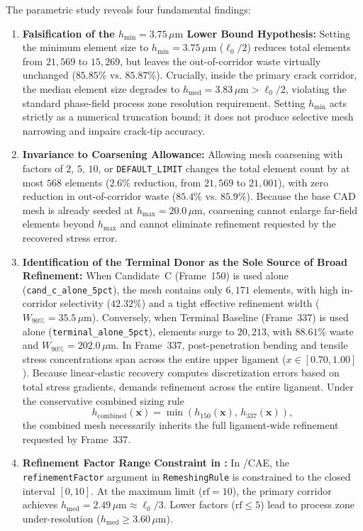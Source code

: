 The parametric study reveals four fundamental findings:
\begin{enumerate}
  \item \textbf{Falsification of the $h_{\min} = 3.75\,\mu\mathrm{m}$ Lower Bound Hypothesis:} Setting the minimum element size to $h_{\min} = 3.75\,\mu\mathrm{m}$ ($\ell_0/2$) reduces total elements from $21{,}569$ to $15{,}269$, but leaves the out-of-corridor waste virtually unchanged ($85.85\%$ vs. $85.87\%$). Crucially, inside the primary crack corridor, the median element size degrades to $h_{\mathrm{med}} = 3.83\,\mu\mathrm{m} > \ell_0/2$, violating the standard phase-field process zone resolution requirement. Setting $h_{\min}$ acts strictly as a numerical truncation bound; it does not produce selective mesh narrowing and impairs crack-tip accuracy.
  \item \textbf{Invariance to Coarsening Allowance:} Allowing mesh coarsening with factors of $2$, $5$, $10$, or \texttt{DEFAULT\_LIMIT} changes the total element count by at most $568$ elements ($2.6\%$ reduction, from $21{,}569$ to $21{,}001$), with zero reduction in out-of-corridor waste ($85.4\%$ vs. $85.9\%$). Because the base CAD mesh is already seeded at $h_{\max} = 20.0\,\mu\mathrm{m}$, coarsening cannot enlarge far-field elements beyond $h_{\max}$ and cannot eliminate refinement requested by the recovered stress error.
  \item \textbf{Identification of the Terminal Donor as the Sole Source of Broad Refinement:} When Candidate~C (Frame~150) is used alone (\texttt{cand\_c\_alone\_5pct}), the mesh contains only $6{,}171$ elements, with high in-corridor selectivity ($42.32\%$) and a tight effective refinement width ($W_{90\%} = 35.5\,\mu\mathrm{m}$). Conversely, when Terminal Baseline (Frame~337) is used alone (\texttt{terminal\_alone\_5pct}), elements surge to $20{,}213$, with $88.61\%$ waste and $W_{90\%} = 202.0\,\mu\mathrm{m}$. In Frame~337, post-penetration bending and tensile stress concentrations span across the entire upper ligament ($x \in [0.70, 1.00]$). Because linear-elastic recovery computes discretization errors based on total stress gradients, \Abaqus demands refinement across the entire ligament. Under the conservative combined sizing rule
  \begin{equation}
    h_{\mathrm{combined}}(\mathbf{x}) = \min\left(h_{150}(\mathbf{x}),\, h_{337}(\mathbf{x})\right),
    \label{eq:combined_min_rule}
  \end{equation}
  the combined mesh necessarily inherits the full ligament-wide refinement requested by Frame~337.
  \item \textbf{Refinement Factor Range Constraint in \Abaqus:} In \Abaqus/CAE, the \texttt{refinementFactor} argument in \texttt{RemeshingRule} is constrained to the closed interval $[0, 10]$. At the maximum limit ($\mathrm{rf} = 10$), the primary corridor achieves $h_{\mathrm{med}} = 2.49\,\mu\mathrm{m} \approx \ell_0/3$. Lower factors ($\mathrm{rf} \le 5$) lead to process zone under-resolution ($h_{\mathrm{med}} \ge 3.60\,\mu\mathrm{m}$).
\end{enumerate}

